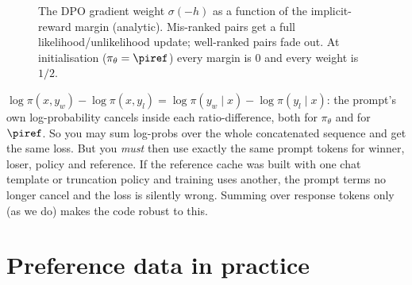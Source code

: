 \begin{figure}[t]
\centering
{}
\caption{The DPO gradient weight $\sigma(-h)$ as a function of the implicit-reward margin
(analytic). Mis-ranked pairs get a full likelihood/unlikelihood update; well-ranked pairs fade
out. At initialisation ($\pi_\theta=\piref$) every margin is $0$ and every weight is $1/2$.}
\label{fig:dpo:grad}
\end{figure}

\begin{pitfall}
$\log\pi(x,y_w)-\log\pi(x,y_l)=\log\pi(y_w\mid x)-\log\pi(y_l\mid x)$: the prompt's own
log-probability cancels inside each ratio-difference, both for $\pi_\theta$ and for $\piref$. So you
may sum log-probs over the whole concatenated sequence and get the same loss. But you \emph{must}
then use exactly the same prompt tokens for winner, loser, policy and reference. If the reference
cache was built with one chat template or truncation policy and training uses another, the
prompt terms no longer cancel and the loss is silently wrong. Summing over response tokens only
(as we do) makes the code robust to this.
\end{pitfall}

\section{Preference data in practice}\label{sec:dpo:data}

